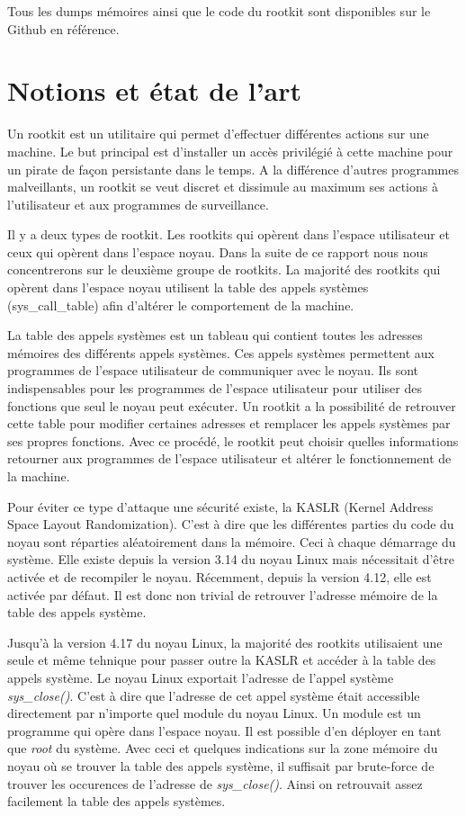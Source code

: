 \documentclass[journal, a4paper]{IEEEtran}
\begin{document}
Tous les dumps mémoires ainsi que le code du rootkit sont disponibles sur le Github en référence.

\section{Notions et état de l'art}

Un rootkit est un utilitaire qui permet d'effectuer différentes actions sur une machine. Le but principal est d'installer un accès privilégié à cette machine pour un pirate de façon persistante dans le temps. A la différence d'autres programmes malveillants, un rootkit se veut discret et dissimule au maximum ses actions à l'utilisateur et aux programmes de surveillance.

Il y a deux types de rootkit. Les rootkits qui opèrent dans l'espace utilisateur et ceux qui opèrent dans l'espace noyau. Dans la suite de ce rapport nous nous concentrerons sur le deuxième groupe de rootkits. La majorité des rootkits qui opèrent dans l'espace noyau utilisent la table des appels systèmes (sys\_call\_table) afin d'altérer le comportement de la machine.

La table des appels systèmes est un tableau qui contient toutes les adresses mémoires des différents appels systèmes. Ces appels systèmes permettent aux programmes de l'espace utilisateur de communiquer avec le noyau. Ils sont indispensables pour les programmes de l'espace utilisateur pour utiliser des fonctions que seul le noyau peut exécuter. Un rootkit a la possibilité de retrouver cette table pour modifier certaines adresses et remplacer les appels systèmes par ses propres fonctions. Avec ce procédé, le rootkit peut choisir quelles informations retourner aux programmes de l'espace utilisateur et altérer le fonctionnement de la machine.

Pour éviter ce type d'attaque une sécurité existe, la  KASLR (Kernel Address Space Layout Randomization). C'est à dire que les différentes parties du code du noyau sont réparties aléatoirement dans la mémoire. Ceci à chaque démarrage du système. Elle existe depuis la version 3.14 du noyau Linux mais nécessitait d'être activée et de recompiler le noyau. Récemment, depuis la version 4.12, elle est activée par défaut. Il est donc non trivial de retrouver l'adresse mémoire de la table des appels système.

Jusqu'à la version 4.17 du noyau Linux, la majorité des rootkits utilisaient une seule et même tehnique pour passer outre la KASLR et accéder à la table des appels système. Le noyau Linux exportait l'adresse de l'appel système \textit{sys\_close()}. C'est à dire que l'adresse de cet appel système était accessible directement par n'importe quel module du noyau Linux. Un module est un programme qui opère dans l'espace noyau. Il est possible d'en déployer en tant que \textit{root} du système. Avec ceci et quelques indications sur la zone mémoire du noyau où se trouver la table des appels système, il suffisait par brute-force de trouver les occurences de l'adresse de \textit{sys\_close()}. Ainsi on retrouvait assez facilement la table des appels systèmes.
\end{document}

